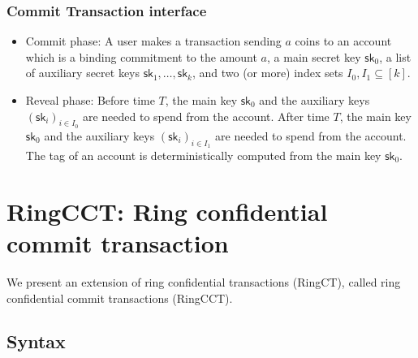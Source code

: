 \documentclass{article}      	%
\begin{document}
\subsubsection{Commit Transaction interface}
\begin{itemize}[topsep=0pt, itemsep=0pt, leftmargin=2em]
	\item Commit phase: A user makes a transaction sending $a$ coins to an account which is a binding commitment to the amount $a$, a main secret key $\mathsf{sk}_0$, a list of auxiliary secret keys $\mathsf{sk}_1, \dots, \mathsf{sk}_k$, and two (or more) index sets $I_0, I_1 \subseteq [k]$.
	\item Reveal phase: Before time $T$, the main key $\mathsf{sk}_0$ and the auxiliary keys $(\mathsf{sk}_i)_{i \in I_0}$ are needed to spend from the account. After time $T$, the main key $\mathsf{sk}_0$ and the auxiliary keys $(\mathsf{sk}_i)_{i \in I_1}$ are needed to spend from the account. The tag of an account is deterministically computed from the main key $\mathsf{sk}_0$.
\end{itemize}


\section{RingCCT: Ring confidential commit transaction}
We present an extension of ring confidential transactions (RingCT), called ring confidential commit transactions (RingCCT).

\subsection{Syntax}
\end{document}
